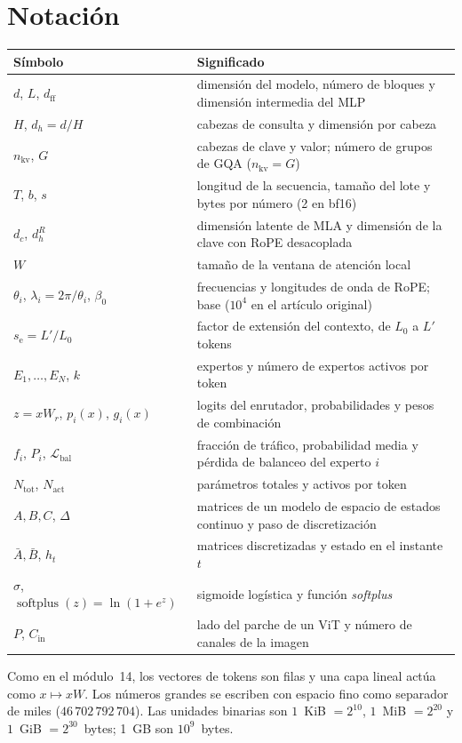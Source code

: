 \documentclass[11pt,a4paper,twoside,openany]{book}
\newcommand{\softplus}{\operatorname{softplus}}
\newcommand{\Lbal}{\mathcal{L}_{\mathrm{bal}}}
\newcommand{\dff}{d_{\mathrm{ff}}}
\newcommand{\dhd}{d_{h}}
\newcommand{\nkv}{n_{\mathrm{kv}}}
\newcommand{\dc}{d_{c}}
\newcommand{\Abar}{\bar{A}}
\newcommand{\Bbar}{\bar{B}}
\newcommand{\Nact}{N_{\mathrm{act}}}
\newcommand{\Ntot}{N_{\mathrm{tot}}}
\begin{document}
\section*{Notación}
\begin{center}\small
\begin{tabularx}{\textwidth}{@{}l>{\raggedright\arraybackslash}X@{}}
\toprule
Símbolo & Significado \\
\midrule
$d$, $L$, $\dff$ & dimensión del modelo, número de bloques y dimensión intermedia del MLP \\
$H$, $\dhd=d/H$ & cabezas de consulta y dimensión por cabeza \\
$\nkv$, $G$ & cabezas de clave y valor; número de grupos de GQA ($\nkv=G$) \\
$T$, $b$, $s$ & longitud de la secuencia, tamaño del lote y bytes por número (2 en bf16) \\
$\dc$, $d_h^{R}$ & dimensión latente de MLA y dimensión de la clave con RoPE desacoplada \\
$W$ & tamaño de la ventana de atención local \\
$\theta_i$, $\lambda_i=2\pi/\theta_i$, $\beta_0$ & frecuencias y longitudes de onda de RoPE; base ($10^{4}$ en el artículo original) \\
$s_{\mathrm{e}}=L'/L_0$ & factor de extensión del contexto, de $L_0$ a $L'$ tokens \\
$E_1,\dots,E_N$, $k$ & expertos y número de expertos activos por token \\
$z=xW_r$, $p_i(x)$, $g_i(x)$ & logits del enrutador, probabilidades y pesos de combinación \\
$f_i$, $P_i$, $\Lbal$ & fracción de tráfico, probabilidad media y pérdida de balanceo del experto $i$ \\
$\Ntot$, $\Nact$ & parámetros totales y activos por token \\
$A,B,C$, $\Delta$ & matrices de un modelo de espacio de estados continuo y paso de discretización \\
$\Abar,\Bbar$, $h_t$ & matrices discretizadas y estado en el instante $t$ \\
$\sigma$, $\softplus(z)=\ln(1+e^{z})$ & sigmoide logística y función \emph{softplus} \\
$P$, $C_{\mathrm{in}}$ & lado del parche de un ViT y número de canales de la imagen \\
\bottomrule
\end{tabularx}
\end{center}

Como en el módulo~14, los vectores de tokens son filas y una capa lineal actúa como $x\mapsto xW$. Los números grandes se escriben con espacio fino como separador de miles ($46\,702\,792\,704$). Las unidades binarias son $1$~KiB $=2^{10}$, $1$~MiB $=2^{20}$ y $1$~GiB $=2^{30}$~bytes; 1~GB son $10^{9}$~bytes.

\tableofcontents

\mainmatter







\appendix


\backmatter

\end{document}
